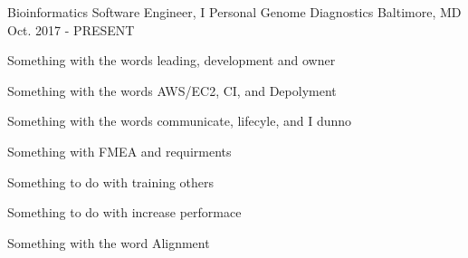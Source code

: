 

\begin{cventries}

  \cventry
    {Bioinformatics Software Engineer, I} %
    {Personal Genome Diagnostics} %
    {Baltimore, MD} %
    {Oct. 2017 - PRESENT} %
    {
      \begin{cvitems} %
        \item{Something with the words leading, development and owner}
        \item{Something with the words AWS/EC2, CI, and Depolyment}
        \item{Something with the words communicate, lifecyle, and I dunno}
        \item{Something with FMEA and requirments}
        \item{Something to do with training others}
        \item{Something to do with increase performace}
        \item{Something with the word Alignment}
      \end{cvitems}
    }


\end{cventries}
